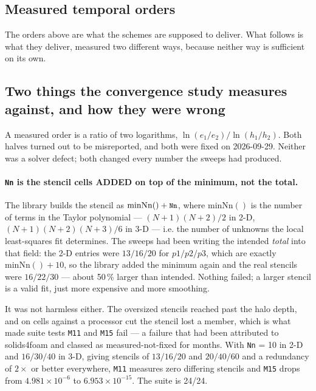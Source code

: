 \documentclass[11pt,a4paper]{article}
\newcommand{\code}[1]{\texttt{\small #1}}
\begin{document}
\subsection{Measured temporal orders}
\label{sec:measured-temporal-orders}

The orders above are what the schemes are supposed to deliver. What follows is
what they deliver, measured two different ways, because neither way is
sufficient on its own.

\subsection{Two things the convergence study measures against, and how they were
wrong}
\label{sec:h-and-nn}

A measured order is a ratio of two logarithms, $\ln(e_1/e_2)/\ln(h_1/h_2)$. Both
halves turned out to be misreported, and both were fixed on 2026-09-29. Neither
was a solver defect; both changed every number the sweeps had produced.

\paragraph{\code{Nn} is the stencil cells ADDED on top of the minimum, not the
total.} The library builds the stencil as $\mathrm{minNn}() + \code{Nn}$, where
$\mathrm{minNn}()$ is the number of terms in the Taylor polynomial ---
$(N{+}1)(N{+}2)/2$ in 2-D, $(N{+}1)(N{+}2)(N{+}3)/6$ in 3-D --- i.e. the number of
unknowns the local least-squares fit determines. The sweeps had been writing the
intended \emph{total} into that field: the 2-D entries were $13/16/20$ for
$p1/p2/p3$, which are exactly $\mathrm{minNn}()+10$, so the library added the
minimum again and the real stencils were $16/22/30$ --- about 50\,\% larger than
intended. Nothing failed; a larger stencil is a valid fit, just more expensive and
more smoothing.

It was not harmless either. The oversized stencils reached past the halo depth, and
on cells against a processor cut the stencil lost a member, which is what made
suite tests \code{M11} and \code{M15} fail --- a failure that had been attributed
to solids4foam and classed as measured-not-fixed for months. With \code{Nn} = 10
in 2-D and $16/30/40$ in 3-D, giving stencils of $13/16/20$ and $20/40/60$ and a
redundancy of $2\times$ or better everywhere, \code{M11} measures zero differing
stencils and \code{M15} drops from $4.981\times10^{-6}$ to
$6.953\times10^{-15}$. The suite is 24/24.
\end{document}
